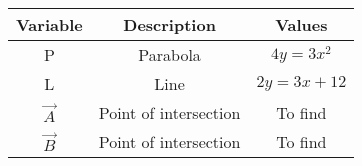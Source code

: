 
\begin{tabular}[12pt]{ |c| c| c|}
    \hline
    \textbf{Variable} & \textbf{Description} & \textbf{Values} \\ 
    \hline
    P & Parabola & $4y = 3x^2$ \\
    \hline
    L & Line & $2y=3x+12$ \\
    \hline
    $\vec{A}$ & Point of intersection & To find \\
    \hline
    $\vec{B}$ & Point of intersection & To find \\
    \hline
   
    \end{tabular}

